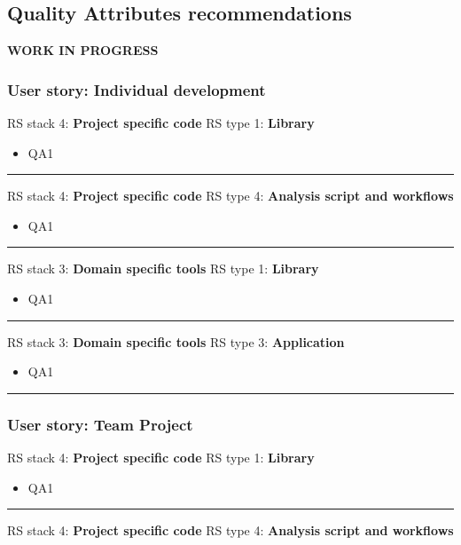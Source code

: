 \subsection{Quality Attributes recommendations}

\textbf{WORK IN PROGRESS}


\subsubsection{User story: Individual development}

RS stack 4: \textbf{Project specific code} \tab RS type 1: \textbf{Library}

\begin{itemize}
    \item QA1
\end{itemize}
\hrule

RS stack 4: \textbf{Project specific code} \tab RS type 4: \textbf{Analysis script and workflows}

\begin{itemize}
    \item QA1
\end{itemize}
\hrule

RS stack 3: \textbf{Domain specific tools} \tab RS type 1: \textbf{Library}

\begin{itemize}
    \item QA1
\end{itemize}
\hrule

RS stack 3: \textbf{Domain specific tools} \tab RS type 3: \textbf{Application}

\begin{itemize}
    \item QA1
\end{itemize}
\hrule

\subsubsection{User story: Team Project}

RS stack 4: \textbf{Project specific code} \tab RS type 1: \textbf{Library}

\begin{itemize}
    \item QA1
\end{itemize}
\hrule

RS stack 4: \textbf{Project specific code} \tab RS type 4: \textbf{Analysis script and workflows}

